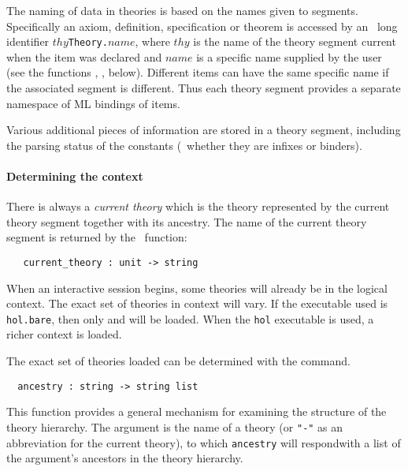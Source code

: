 The naming of data in theories is based on the names given to segments.
Specifically an axiom, definition, specification or theorem is
accessed
by an \ML\ long identifier $thy${\small\verb+Theory.+}$name$, where
$thy$ is the name of the theory segment current when the item was
declared and $name$ is a specific name supplied by the user (see the
functions , , below). Different items
can have the same specific name if the associated segment is different.
Thus each theory segment provides a separate namespace of ML bindings of
\HOL{} items.

Various additional pieces of information are stored in a theory
segment, including the parsing status of the constants (\eg\ whether
they are infixes or binders).

\paragraph {Determining the context}

There is always a \emph{current theory} which is the theory
represented by the current theory segment together with its
ancestry. The name of the current theory segment is returned by the \ML\
function:

\begin{holboxed}
\begin{verbatim}
   current_theory : unit -> string
\end{verbatim}
\end{holboxed}

  When an interactive \HOL{} session begins, some theories will
  already be in the logical context. The exact set of theories in
  context will vary.  If the executable used is \texttt{hol.bare},
  then only \theoryimp{min} and \theoryimp{bool} will be loaded.  When
  the \texttt{hol} executable is used, a richer context is loaded.

The exact set of theories loaded can be determined with the
 command.
%
\begin{holboxed}
\begin{verbatim}
  ancestry : string -> string list
\end{verbatim}
\end{holboxed}

This function provides a general mechanism for examining the structure
of the theory hierarchy.  The argument is the name of a theory (or
\texttt{"-"} as an abbreviation for the current theory), to which
\texttt{ancestry} will respondwith a list of the argument's ancestors
in the theory hierarchy.

